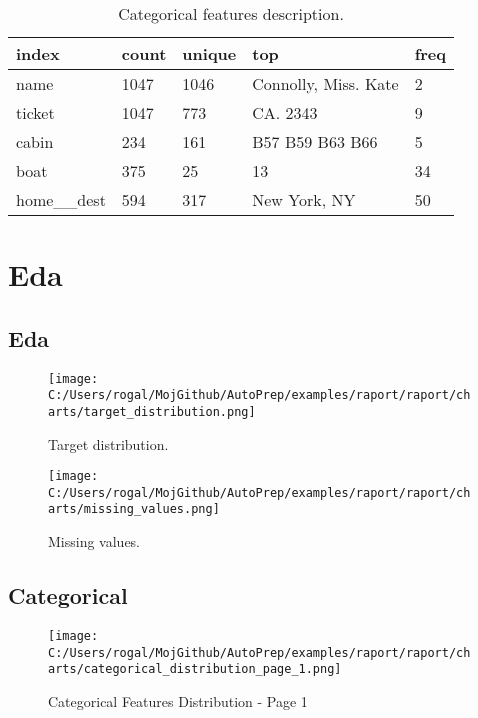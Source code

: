 \documentclass{article}%
\begin{document}
%


\begin{table}[H]%
\begin{center}%
\begin{tabular}{l l l l l}%
\hline%
\textbf{index}&\textbf{count}&\textbf{unique}&\textbf{top}&\textbf{freq}\\%
\hline%
name&1047&1046&Connolly, Miss. Kate&2\\%
ticket&1047&773&CA. 2343&9\\%
cabin&234&161&B57 B59 B63 B66&5\\%
boat&375&25&13&34\\%
home\_\_dest&594&317&New York, NY&50\\%
\hline%
\end{tabular}%
\end{center}%
\caption{Categorical features description.}%
\end{table}

%
\section{Eda}%
\label{sec:Eda}%

%
\subsection{Eda}%
\label{subsec:Eda}%

%


\begin{figure}[H]%
\centering%
\texttt{[image: C:/Users/rogal/MojGithub/AutoPrep/examples/raport/raport/charts/target\_distribution.png]}%
\caption{Target distribution.}%
\end{figure}

%


\begin{figure}[H]%
\centering%
\texttt{[image: C:/Users/rogal/MojGithub/AutoPrep/examples/raport/raport/charts/missing\_values.png]}%
\caption{Missing values.}%
\end{figure}

%
\subsection{Categorical}%
\label{subsec:Categorical}%

%


\begin{figure}[H]%
\centering%
\texttt{[image: C:/Users/rogal/MojGithub/AutoPrep/examples/raport/raport/charts/categorical\_distribution\_page\_1.png]}%
\caption{Categorical Features Distribution {-} Page 1}%
\end{figure}
\end{document}
